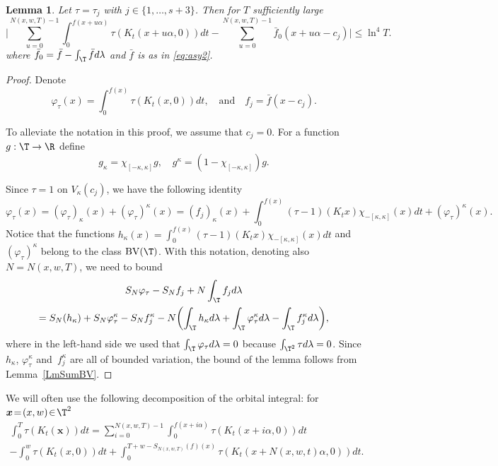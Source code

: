 \documentclass[JEP,XML,SOM,Unicode,NoFloatCountersInSection]{cedram}
\newcommand\BV{\mathrm{BV}}
\newcommand\bx{\boldsymbol{x}}
\theoremstyle{definition}
\theoremstyle{plain}
\newtheorem{lemma}[definition]{Lemma}
\begin{document}
\begin{lemma}
\label{LmErgSumRetT}
Let $\tau=\tau_j$ with $j\in \{1,\ldots, s+3\}$. Then for $T$ sufficiently large
\[
\biggl|\sum_{u=0}^{N(x,w,T)-1}\int_0^{f(x+u\alpha)}\tau(K_t(x+u\alpha,0))dt-\sum_{u=0}^{N(x,w,T)-1}\bar{f}_0(x+u\alpha-c_j)\biggr|\leq \ln^4T.
\]
where $\bar{f}_0=\bar{f}-\int_\T \bar{f} d\lambda$ and $\bar{f}$ is as in \eqref{eq:asy2}.
\end{lemma}

\begin{proof}
Denote
\[
\varphi_{\tau}(x)=\int_0^{f(x)}\tau(K_t(x,0))d{t}, \quad\text{and}\quad
f_j=\bar{f}(x-c_j).
\]

To alleviate the notation in this proof, we assume that $c_j=0$. For a function $g:\T \to \R$ define
\[
g_\kappa=\chi_{[-\kappa,\kappa]} g, \quad g^\kappa=(1-\chi_{[-\kappa,\kappa]}) g.
\]

Since $\tau=1$ on $V_\kappa(c_j)$, we have the following identity
\[
\varphi_\tau(x)=(\varphi_\tau)_{\kappa}(x)+(\varphi_\tau)^{\kappa}(x)= (f_j)_{\kappa}(x)+ \int_{0}^{f(x)}(\tau-1)(K_tx)\chi_{-[\kappa,\kappa]}(x)d{t}+(\varphi_\tau)^{\kappa}(x).
\]
Notice that the functions $h_\kappa(x)=\int_{0}^{f(x)}(\tau-1)(K_tx)\chi_{-[\kappa,\kappa]}(x)d{t}$ and $(\varphi_\tau)^{\kappa}$ belong to the class $\BV(\T)$.
With this notation, denoting also $N=N(x,w,T)$, we need to bound
\begin{multline*}
S_N \varphi_\tau-S_N f_j +N\int_{\T} f_j d\lambda\\
= S_N(h_\kappa)+
S_N \varphi_\tau^\kappa-S_N f_j^\kappa -N\biggl(\int_{\T} h_\kappa d\lambda+\int_{\T} \varphi_\tau^\kappa d\lambda-\int_{\T} f_j^\kappa d\lambda \biggr),
\end{multline*}
where in the left-hand side we used that $\int_{\T} \varphi_{\tau} d\lambda=0$ because $\int_{\T^2} \tau d\lambda=0$.
Since $h_\kappa$, $\varphi_{\tau}^{\kappa}$ and~$f_j^{\kappa}$ are all of bounded variation,
the bound of the lemma follows from Lemma~\ref{LmSumBV}.
\end{proof}

\noindent We will often use the following decomposition of the orbital integral: for $\bx\!=\!(x,w)\!\in\! \T^2$\vspace*{-5pt}
\begin{multline}\label{mult:dec}
\int_{0}^T\tau(K_t(\bx))dt=\sum_{i=0}^{N(x,w,T)-1}\int_0^{f(x+i\alpha)}\tau(K_t(x+i\alpha,0))dt\\
-\int_0^w\tau(K_t(x,0))dt+ \int_0^{T+w-S_{N(x,w,T)}(f)(x)}\tau(K_t(x+N(x,w,t)\alpha,0))dt.
\end{multline}
\end{document}
